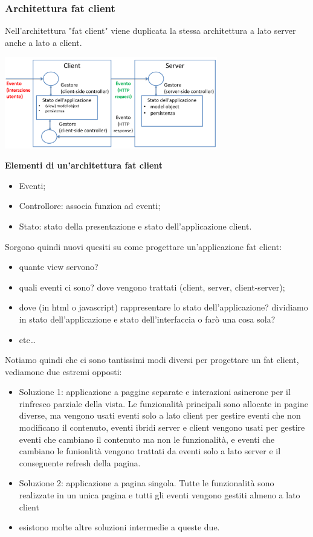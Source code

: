 \subsubsection{Architettura fat client}
Nell'architettura "fat client" viene duplicata la stessa architettura a lato server anche a lato a client.
\begin{center}
    \includegraphics[height=4cm]{../lezione12/img1.PNG}
\end{center}
\textbf{Elementi di un'architettura fat client}
\begin{itemize}
    \item Eventi;
    \item Controllore: associa funzion ad eventi;
    \item Stato: stato della presentazione e stato dell'applicazione client.
\end{itemize}
Sorgono quindi nuovi quesiti su come progettare un'applicazione fat client: 
\begin{itemize}
    \item quante view servono?
    \item quali eventi ci sono? dove vengono trattati (client, server, client-server);
    \item dove (in html o javascript) rappresentare lo stato dell'applicazione? dividiamo in stato dell'applicazione e stato dell'interfaccia o farò una cosa sola?
    \item etc\dots
\end{itemize}
Notiamo quindi che ci sono tantissimi modi diversi per progettare un fat client, vediamone due estremi opposti:
\begin{itemize}
    \item Soluzione 1: applicazione a paggine separate e interazioni asincrone per il rinfresco parziale    della vista. Le funzionalità principali sono allocate in pagine diverse, ma vengono usati eventi solo a lato client per gestire eventi che non modificano il contenuto, eventi ibridi server e client vengono usati per gestire eventi che cambiano il contenuto ma non le funzionalità, e eventi che cambiano le funionlità vengono trattati da eventi solo a lato server e il conseguente refresh della pagina.
    \item Soluzione 2: applicazione a pagina singola. Tutte le funzionalità sono realizzate in un unica pagina e tutti gli eventi vengono gestiti almeno a lato client
    \item esistono molte altre soluzioni intermedie a queste due.
\end{itemize}
\ \newline